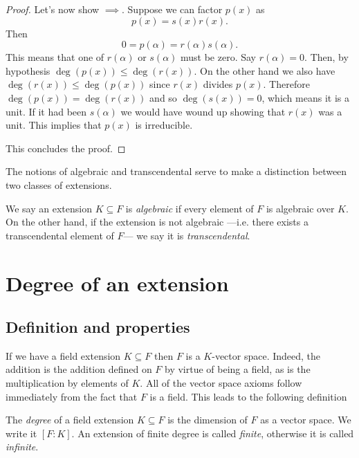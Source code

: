 \documentclass[12pt,oneside]{book}
\begin{document}
{\begin{proof}
		Let's now show \( \implies \). Suppose we can factor \( p(x)
		\) as
		\begin{equation*}
			p(x) = s(x)r(x).
		\end{equation*}
		Then
		\begin{equation*}
			0 = p(\alpha) = r(\alpha)s(\alpha).
		\end{equation*}
		This means that one of \( r(\alpha) \) or \( s(\alpha) \) must be zero. Say \(
		r(\alpha) = 0 \). Then, by hypothesis \( \deg(p(x)) \leq \deg(r(x)) \). On the other
		hand we also have \( \deg(r(x)) \leq \deg(p(x)) \) since \( r(x) \) divides \( p(x)
		\). Therefore \( \deg(p(x)) = \deg(r(x)) \) and so \( \deg(s(x)) = 0 \), which means
		it is a unit. If it had been \( s(\alpha)	\) we would have wound up showing that \(
		r(x) \) was a unit. This implies that \( p(x) \) is irreducible. 

		This concludes the proof.
	\end{proof}
}
\parbreak

The notions of algebraic and transcendental serve to make a distinction between two
classes of extensions.
\begin{definition}
	We say an extension \( K \subseteq F \) is \emph{algebraic} if every element of \( F \) is
	algebraic over \( K \). On the other hand, if the extension is not algebraic ---i.e. there
	exists a transcendental element of \( F \)--- we say it is \emph{transcendental}.
\end{definition}


\section{Degree of an extension}
\subsection{Definition and properties}
If we have a field extension \( K \subseteq F \) then \( F \) is a \( K \)-vector space.
Indeed, the addition is the addition defined on \( F \) by virtue of being a field, as is
the multiplication by elements of \( K \). All of the vector space axioms follow
immediately from the fact that \( F \) is a field. This leads to the following definition
\begin{definition}
	The \emph{degree} of a field extension \( K \subseteq F \) is the dimension of \( F \)
	as a vector space. We write it \( [F \colon K] \). An extension of finite degree is called \emph{finite}, otherwise it is called
	\emph{infinite}.
\end{definition}
\end{document}

